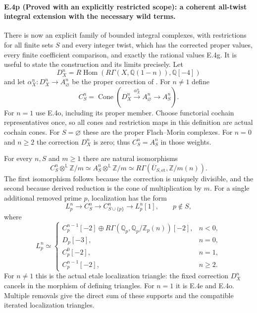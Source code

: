 \paragraph{E.4p (Proved with an explicitly restricted scope): a coherent all-twist integral extension with the necessary wild terms.}
There is now an explicit family of bounded integral complexes,
with restrictions for all finite sets $S$ and every integer
twist, which has the corrected proper values, every finite
coefficient comparison, and exactly the rational values E.4g.
It is useful to state the construction and its limits precisely.
Let
\[
 D_X^n=R\operatorname{Hom}
        (R\Gamma(X,\mathbb Q(1-n)),\mathbb Q[-4])
\]
and let $\alpha_X^n:D_X^n\to A_\varnothing^n$ be the
proper correction of \citet[Theorem 3.5]{D_FlachMorin2018}.
For $n\ne1$ define
\[
 C_S^n=
 \operatorname{Cone}\left(
     D_X^n\xrightarrow{\alpha_X^n}A_\varnothing^n
                        \longrightarrow A_S^n\right).
 \tag{E.4.27}
\]
For $n=1$ use E.4o, including its proper member. Choose
functorial cochain representatives once, so all cones and
restriction maps in this definition are actual cochain cones.
For $S=\varnothing$ these are the proper Flach--Morin complexes.
For $n=0$ and $n\ge2$ the correction $D_X^n$ is zero;
thus $C_S^n=A_S^n$ in those weights.

For every $n,S$ and $m\ge1$ there are natural isomorphisms
\[
 C_S^n\otimes^{\mathbb L}\mathbb Z/m
       \simeq A_S^n\otimes^{\mathbb L}\mathbb Z/m
       \simeq
 R\Gamma(\overline U_{S,\mathrm{et}},\mathbb Z/m(n)).
 \tag{E.4.28}
\]
The first isomorphism follows because the correction is
uniquely divisible, and the second because derived reduction
is the cone of multiplication by $m$.
For a single additional removed prime $p$, localization has
the form
\[
 L_p^n\longrightarrow C_S^n\longrightarrow C_{S\cup\{p\}}^n
       \longrightarrow L_p^n[1],
 \qquad p\notin S,
 \tag{E.4.29}
\]
where
\[
 L_p^n\simeq
 \begin{cases}
 C_p^{n-1}[-2]\oplus
   R\Gamma(\mathbb Q_p,\mathbb Q_p/\mathbb Z_p(n))[-2],
       &n<0,\\
 D_p[-3],&n=0,\\
 C_p^0[-2],&n=1,\\
 C_p^{n-1}[-2],&n\ge2.
 \end{cases}
 \tag{E.4.30}
\]
For $n\ne1$ this is the actual etale localization triangle:
the fixed correction $D_X^n$ cancels in the morphism of
defining triangles. For $n=1$ it is E.4e and E.4o.
Multiple removals give the direct sum of these supports and
the compatible iterated localization triangles.

